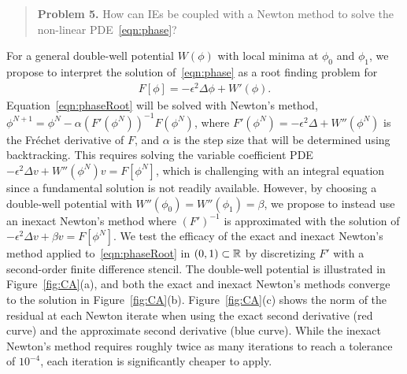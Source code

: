 \begin{quotation}
  \noindent
  \textbf{Problem 5.} How can IEs be coupled with a Newton method to
  solve the non-linear PDE~\eqref{eqn:phase}?
\end{quotation}

For a general double-well potential $W(\phi)$ with local minima at
$\phi_0$ and $\phi_1$, we propose to interpret the solution
of~\eqref{eqn:phase} as a root finding problem for
\begin{align}
  \label{eqn:phaseRoot}
  F[\phi] = -\epsilon^2 \Delta \phi + W'(\phi).
\end{align}
Equation~\eqref{eqn:phaseRoot} will be solved with Newton's method,
$\phi^{N+1} = \phi^{N} - \alpha (F'(\phi^N))^{-1} F(\phi^N)$, where
$F'(\phi^N) = -\epsilon^2 \Delta + W''(\phi^N)$ is the
Fr\'{e}chet derivative of $F$, and $\alpha$ is the step size that will
be determined using backtracking. This requires solving the variable
coefficient PDE $-\epsilon^2 \Delta v + W''(\phi^{N}) v =
F[\phi^N]$, which is challenging with an integral equation since a
fundamental solution is not readily available. However, by choosing a
double-well potential with $W''(\phi_0) = W''(\phi_1) = \beta$, we
propose to instead use an inexact Newton's method where $(F')^{-1}$ is
approximated with the solution of $-\epsilon^2 \Delta v +
\beta v = F[\phi^N]$. We test the efficacy of the exact and
inexact Newton's method applied to~\eqref{eqn:phaseRoot} in $(0,1)
\subset \mathbb{R}$ by discretizing $F'$ with a second-order finite difference
stencil. The double-well potential is illustrated in
Figure~\ref{fig:CA}(a), and both the exact and inexact Newton's methods
converge to the solution in Figure~\ref{fig:CA}(b).
Figure~\ref{fig:CA}(c) shows the norm of the residual at each Newton
iterate when using the exact second derivative (red curve) and the
approximate second derivative (blue curve). While the inexact Newton's
method requires roughly twice as many iterations to reach a tolerance
of $10^{-4}$, each iteration is significantly cheaper to apply.

